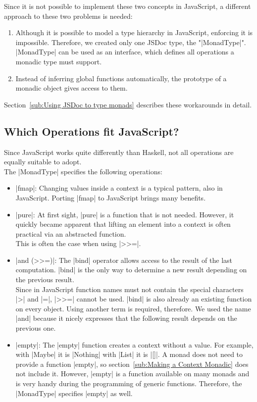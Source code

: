 Since it is not possible to implement these two concepts in JavaScript, a
different approach to these two problems is needed:
\begin{enumerate}
  \item Although it is possible to model a type hierarchy in JavaScript,
    enforcing it is impossible. Therefore, we created only one JSDoc type, the
    "|MonadType|". |MonadType| can be used as an interface, which defines all
    operations a monadic type must support.  
  \item Instead of inferring global functions automatically, the prototype of a
    monadic object gives access to them. \cite{mdn_prototype_2023}
\end{enumerate}
Section~\ref{sub:Using JSDoc to type monads} describes these workarounds in
detail.

\subsection{Which Operations fit JavaScript?} %
\label{sub:Which operations fit JavaScript?}
Since JavaScript works quite differently than Haskell, not all operations are
equally suitable to adopt. \\
The |MonadType| specifies the following operations:
\begin{itemize}
  \item |fmap|: Changing values inside a context is a typical pattern,
    also in JavaScript. Porting |fmap| to JavaScript brings many benefits.
  \item |pure|: At first sight, |pure| is a function that is not needed.
    However, it quickly became apparent that lifting an element into a context
    is often practical via an abstracted function. 
    \\ This is often the case when using |>>=|.
  \item |and (>>=)|: The |bind| operator allows access to the result of the last
    computation. |bind| is the only way to determine a new result depending on
    the previous result. \\ Since in JavaScript function names must not contain
    the special characters |>| and |=|, |>>=| cannot be used. |bind| is also
    already an existing function on every object. Using another term is
    required, therefore. We used the name |and| because it nicely expresses
    that the following result depends on the previous one.
  \item |empty|: The |empty| function creates a context without a value. For
    example, with |Maybe| it is |Nothing| with |List| it is |[]|. A monad does
    not need to provide a function |empty|, so section~\ref{sub:Making a
    Context Monadic} does not include it. However, |empty| is a function
    available on many monads and is very handy during the programming of
    generic functions. Therefore, the |MonadType| specifies |empty| as well.

\end{itemize}

